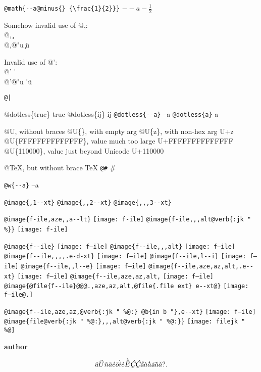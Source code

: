 \documentclass{book}
\renewcommand{\_}{\Texinfounderscore\discretionary{}{}{}}
\renewcommand{\includegraphics}[1]{\fbox{FIG \detokenize{#1}}}
\begin{document}
\texttt{@math\{{-}{-}a@minus\{\}\ \{\textbackslash{}frac\{1\}\{2\}\}\}} $--a- {\frac{1}{2}}$




Somehow invalid use of @,:\leavevmode{}\\
@, \c{}\leavevmode{}\\
@,@"u \c{}\"{u}

Invalid use of @':\leavevmode{}\\
@' \'{}\leavevmode{}\\
@'@"u \'{}\"{u}

\texttt{@|} 

@dotless\{truc\} truc
@dotless\{ij\} ij
\texttt{@dotless\{{-}{-}a\}} --a
\texttt{@dotless\{a\}} a

@U, without braces @U\{\}, with empty arg 
@U\{z\}, with non-hex arg U+z
@U\{FFFFFFFFFFFFFF\}, value much too large U+FFFFFFFFFFFFFF
@U\{110000\}, value just beyond Unicode U+110000

@TeX, but without brace \TeX{}
\texttt{@\#} \#

\texttt{@w\{{-}{-}a\}} \hbox{--a}

\texttt{@image\{,1{-}{-}xt\}} 
\texttt{@image\{{,}{,}2{-}{-}xt\}} 
\texttt{@image\{{,}{,},3{-}{-}xt\}} 

\texttt{@image\{f-ile,aze{,}{,}a{-}{-}lt\}} \texttt{[image: f-ile]}
\texttt{@image\{f-ile{,}{,},alt@verb\{:jk \_" \%\@\}\}} \texttt{[image: f-ile]}

\texttt{@image\{f{-}{-}ile\}} \texttt{[image: f--ile]}
\texttt{@image\{f{-}{-}ile{,}{,},alt\}} \texttt{[image: f--ile]}
\texttt{@image\{f{-}{-}ile{,}{,}{,}{,}.e-d-xt\}} \texttt{[image: f--ile]}
\texttt{@image\{f{-}{-}ile,l{-}{-}i\}} \texttt{[image: f--ile]}
\texttt{@image\{f{-}{-}ile{,}{,}l{-}{-}e\}} \texttt{[image: f--ile]}
\texttt{@image\{f{-}{-}ile,aze,az,alt,.e{-}{-}xt\}} \texttt{[image: f--ile]}
\texttt{@image\{f{-}{-}ile,aze,az,alt,} \texttt{[image: f--ile]}
\texttt{@image\{@file\{f{-}{-}ile\}@@@.,aze,az,alt,@file\{.file ext\}\ e{-}{-}xt@\}} \texttt{[image: f--ile@.]}

\texttt{@image\{f{-}{-}ile,aze,az,@verb\{:jk \_" \%@:\}\ @b\{in b "\},e{-}{-}xt\}} \texttt{[image: f--ile]}
\texttt{@image\{file@verb\{:jk \_" \%@:\}{,}{,},alt@verb\{:jk \_" \%@:\}\}} \texttt{[image: filejk \_" \\\%@]}


{\bfseries author}%

\[
\ddot{u} \ddot{U} \tilde{n} \hat{a} \acute{e} \bar{o} \grave{i} \acute{e} \grave{\bar{E}}
\textsl{\c{\'{C}}} \textsl{\c{\'{C}}} \textsl{\H{a}} \dot{a} \mathring{a} \textsl{\t{a}}
\breve{a} \check{a}
 ? .
\]
\end{document}
